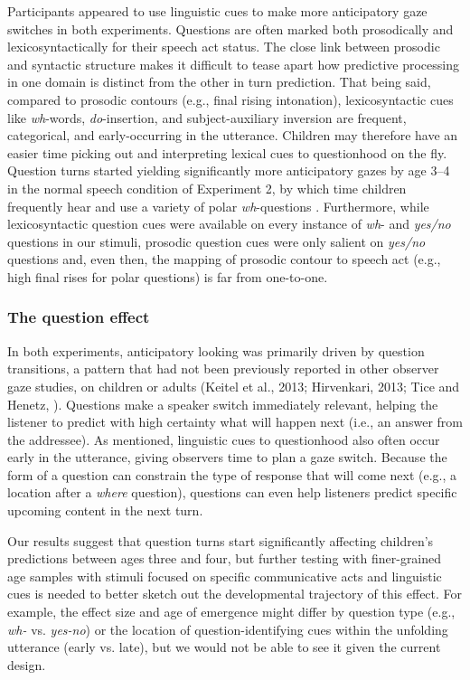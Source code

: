 \documentclass[authoryear, 12pt]{elsarticle}
\begin{document}
Participants appeared to use linguistic cues to make more anticipatory gaze switches in both experiments. Questions are often marked both prosodically and lexicosyntactically for their speech act status. The close link between prosodic and syntactic structure makes it difficult to tease apart how predictive processing in one domain is distinct from the other in turn prediction. That being said, compared to prosodic contours (e.g., final rising intonation), lexicosyntactic cues like \textit{wh}-words, \textit{do}-insertion, and subject-auxiliary inversion are frequent, categorical, and early-occurring in the utterance. Children may therefore have an easier time picking out and interpreting lexical cues to questionhood on the fly. Question turns started yielding significantly more anticipatory gazes by age 3--4 in the normal speech condition of Experiment 2, by which time children frequently hear and use a variety of polar \textit{wh}-questions \citep{clark2009}. Furthermore, while lexicosyntactic question cues were available on every instance of \textit{wh}- and \textit{yes/no} questions in our stimuli, prosodic question cues were only salient on \textit{yes/no} questions and, even then, the mapping of prosodic contour to speech act (e.g., high final rises for polar questions) is far from one-to-one.


\subsubsection{The question effect}

In both experiments, anticipatory looking was primarily driven by question transitions, a pattern that had not been previously reported in other observer gaze studies, on children or adults (Keitel et al., 2013; Hirvenkari, 2013; Tice and Henetz, \citeyear{TiceHenetz11}). Questions make a speaker switch immediately relevant, helping the listener to predict with high certainty what will happen next (i.e., an answer from the addressee). As mentioned, linguistic cues to questionhood also often occur early in the utterance, giving observers time to plan a gaze switch. Because the form of a question can constrain the type of response that will come next (e.g., a location after a \textit{where} question), questions can even help listeners predict specific upcoming content in the next turn.

Our results suggest that question turns start significantly affecting children's predictions between ages three and four, but further testing with finer-grained age samples with stimuli focused on specific communicative acts and linguistic cues is needed to better sketch out the developmental trajectory of this effect. For example, the effect size and age of emergence might differ by question type (e.g., \textit{wh-} vs. \textit{yes-no}) or the location of question-identifying cues within the unfolding utterance (early vs. late), but we would not be able to see it given the current design. 
\end{document}
